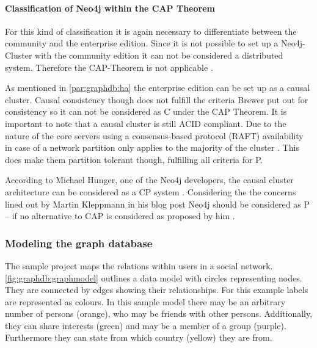 \paragraph{Classification of Neo4j within the CAP Theorem} For this kind of classification it is again necessary to differentiate between the community and the enterprise edition.
Since it is not possible to set up a Neo4j-Cluster with the community edition it can not be considered a distributed system.
Therefore the CAP-Theorem is not applicable \autocite{dzone:understanding_cap}.

As mentioned in \autoref{par:graphdb:ha} the enterprise edition can be set up as a causal cluster.
Causal consistency though does not fulfill the criteria Brewer put out for consistency \autocite{DBLP:journals/corr/Kleppmann15} so it can not be considered as \glqq C\grqq{} under the CAP Theorem.
It is important to note that a causal cluster is still ACID compliant.
Due to the nature of the core servers using a consensus-based protocol (RAFT) availability in case of a network partition only applies to the majority of the cluster \autocite{infoq:neo4j}.
This does make them partition tolerant though, fulfilling all criteria for \glqq P\grqq.

According to Michael Hunger, one of the Neo4j developers, the causal cluster architecture can be considered as a \glqq CP\grqq{} system \autocite{infoq:neo4j}.
Considering the the concerns lined out by Martin Kleppmann in his blog post \autocite{kleppmann:caprant} Neo4j should be considered as \glqq P\grqq{} -- if no alternative to CAP is considered as proposed by him \autocite{DBLP:journals/corr/Kleppmann15}.


\subsubsection{Modeling the graph database}
The sample project maps the relations within users in a social network.
\autoref{fig:graphdb:graphmodel} outlines a data model with circles representing nodes. They are connected by edges showing their relationships.
For this example labels are represented as colours.
In this sample model there may be an arbitrary number of persons (orange), who may be friends with other persons.
Additionally, they can share interests (green) and may be a member of a group (purple).
Furthermore they can state from which country (yellow) they are from.

